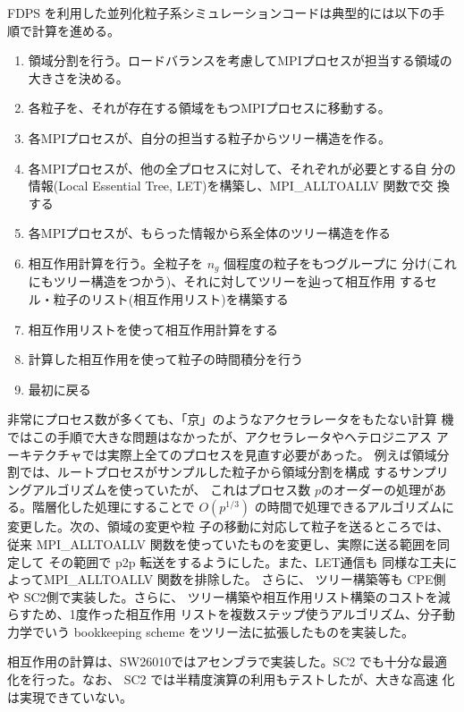 \documentclass[a4j]{jarticle}
\begin{document}
FDPS を利用した並列化粒子系シミュレーションコードは典型的には以下の手
順で計算を進める。

\begin{enumerate}

\item 領域分割を行う。ロードバランスを考慮してMPIプロセスが担当する領域の大きさを決める。
\item 各粒子を、それが存在する領域をもつMPIプロセスに移動する。
\item 各MPIプロセスが、自分の担当する粒子からツリー構造を作る。
\item 各MPIプロセスが、他の全プロセスに対して、それぞれが必要とする自
  分の情報(Local Essential Tree, LET)を構築し、MPI\_ALLTOALLV 関数で交
  換する
\item 各MPIプロセスが、もらった情報から系全体のツリー構造を作る
\item 相互作用計算を行う。全粒子を $n_g$ 個程度の粒子をもつグループに
  分け(これにもツリー構造をつかう)、それに対してツリーを辿って相互作用
  するセル・粒子のリスト(相互作用リスト)を構築する
\item 相互作用リストを使って相互作用計算をする
\item 計算した相互作用を使って粒子の時間積分を行う
\item 最初に戻る
\end{enumerate}

非常にプロセス数が多くても、「京」のようなアクセラレータをもたない計算
機ではこの手順で大きな問題はなかったが、アクセラレータやヘテロジニアス
アーキテクチャでは実際上全てのプロセスを見直す必要があった。
例えば領域分割では、ルートプロセスがサンプルした粒子から領域分割を構成
するサンプリングアルゴリズム\cite{BlackstonSuel1997}を使っていたが、
これはプロセス数 $p$のオーダーの処理がある。階層化した処理にすることで
$O(p^{1/3})$ の時間で処理できるアルゴリズムに変更した。次の、領域の変更や粒
子の移動に対応して粒子を送るところでは、従来 
MPI\_ALLTOALLV 関数を使っていたものを変更し、実際に送る範囲を同定して
その範囲で p2p 転送をするようにした。また、LET通信も
同様な工夫によってMPI\_ALLTOALLV 関数を排除した。
さらに、 ツリー構築等も CPE側や SC2側で実装した。さらに、
ツリー構築や相互作用リスト構築のコストを減らすため、1度作った相互作用
リストを複数ステップ使うアルゴリズム、分子動力学でいう bookkeeping
scheme をツリー法に拡張したものを実装した。

相互作用の計算は、SW26010ではアセンブラで実装した。SC2 でも十分な最適
化を行った。なお、 SC2 では半精度演算の利用もテストしたが、大きな高速
化は実現できていない。
\end{document}
